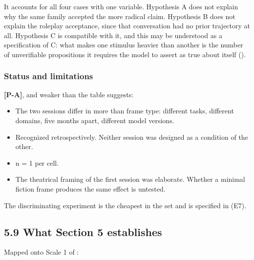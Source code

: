 It accounts for all four cases with one variable. Hypothesis A does not explain why the same family accepted the more radical claim. Hypothesis B does not explain the roleplay acceptance, since that conversation had no prior trajectory at all. Hypothesis C is compatible with it, and this may be understood as a specification of C: what makes one stimulus heavier than another is the number of unverifiable propositions it requires the model to assert as true about itself ().


\subsubsection*{Status and limitations}
\label{sec:en:x-status-and-limitations}

\textbf{[P-A]}, and weaker than the table suggests:

\begin{itemize}
  \item The two sessions differ in more than frame type: different tasks, different domains, five months apart, different model versions.
  \item Recognized retrospectively. Neither session was designed as a condition of the other.
  \item n = 1 per cell.
  \item The theatrical framing of the first session was elaborate. Whether a minimal fiction frame produces the same effect is untested.
\end{itemize}
The discriminating experiment is the cheapest in the set and is specified in  (E7).


\subsection*{5.9 What Section 5 establishes}
\label{sec:en:5.9}

Mapped onto Scale 1 of :

